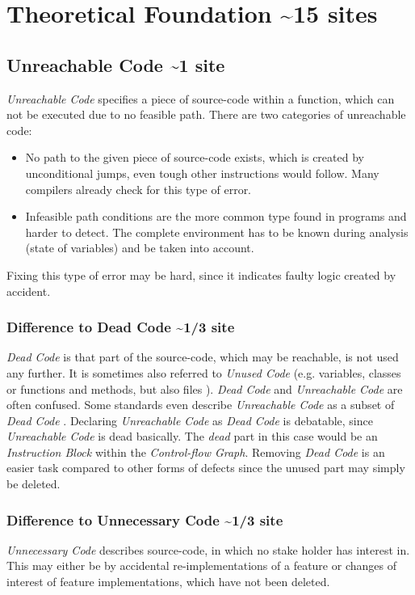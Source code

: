 
\chapter {Theoretical Foundation \textasciitilde 15 sites}
\label {cha:theoretical foundation}

\section{Unreachable Code \textasciitilde 1 site}
\emph{Unreachable Code} specifies a piece of source-code within a function, which can not be executed due to no feasible path.
There are two categories of unreachable code:
\begin{itemize}
	\item No path to the given piece of source-code exists, which is created by unconditional jumps, even tough other instructions would follow. 
	Many compilers already check for this type of error.
	\item Infeasible path conditions are the more common type found in programs and harder to detect. The complete environment has to be known during analysis (state of variables) and be taken into account. 
\end{itemize}

Fixing this type of error may be hard, since it indicates faulty logic created by accident. 

\subsection{Difference to Dead Code \textasciitilde 1/3 site}
\emph{Dead Code} is that part of the source-code, which may be reachable, is not used any further. It is sometimes also referred to \emph{Unused Code}
(e.g. variables, classes or functions and methods, but also files \cite{Boomsma_2012}).
\emph{Dead Code} and \emph{Unreachable Code} are often confused. Some standards even describe \emph{Unreachable Code} as a subset of \emph{Dead Code} \cite{CWECWE561Dead}.
Declaring \emph{Unreachable Code} as \emph{Dead Code} is debatable, since \emph{Unreachable Code} is dead basically. The \emph{dead} part in this case would be an \emph{Instruction Block} within the \emph{Control-flow Graph}.
Removing \emph{Dead Code} is an easier task compared to other forms of defects since the unused part may simply be deleted.
\subsection{Difference to Unnecessary Code \textasciitilde 1/3 site}
\emph{Unnecessary Code} describes source-code, in which no stake holder has interest in. This may either be by accidental re-implementations of a feature or changes of interest of feature implementations, which have not been deleted\cite{Haas_2020}.


